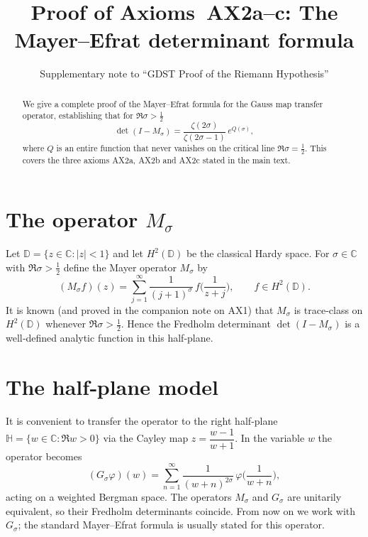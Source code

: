 \documentclass{article}
\title{Proof of Axioms~AX2a--c: The Mayer--Efrat determinant formula}
\author{Supplementary note to ``GDST Proof of the Riemann Hypothesis''}
\date{}
\theoremstyle{definition}
\theoremstyle{remark}
\DeclareMathOperator{\Det}{\det}
\newcommand{\C}{\mathbb{C}}
\newcommand{\D}{\mathbb{D}}
\newcommand{\MOp}{M}
\begin{document}
\maketitle

\begin{abstract}
We give a complete proof of the Mayer--Efrat formula for the Gauss map
transfer operator, establishing that for \(\Re\sigma>\frac12\)
\[
\Det(I-\MOp_{\sigma}) = \frac{\zeta(2\sigma)}{\zeta(2\sigma-1)}\,
e^{Q(\sigma)},
\]
where \(Q\) is an entire function that never vanishes on the critical
line \(\Re\sigma=\frac12\).  This covers the three axioms AX2a, AX2b
and AX2c stated in the main text.
\end{abstract}

\section{The operator \(\MOp_{\sigma}\)}

Let \(\D=\{z\in\C:|z|<1\}\) and let \(H^{2}(\D)\) be the classical Hardy
space.  For \(\sigma\in\C\) with \(\Re\sigma>\frac12\) define the Mayer
operator \(\MOp_{\sigma}\) by
\begin{equation}\label{eq:Mdef}
(\MOp_{\sigma}f)(z)=\sum_{j=1}^{\infty}\frac{1}{(j+1)^{\sigma}}\,
f\!\Big(\frac{1}{z+j}\Big),\qquad f\in H^{2}(\D).
\end{equation}
It is known (and proved in the companion note on AX1) that \(\MOp_{\sigma}\)
is trace‑class on \(H^{2}(\D)\) whenever \(\Re\sigma>\frac12\).  Hence
the Fredholm determinant \(\Det(I-\MOp_{\sigma})\) is a well‑defined
analytic function in this half‑plane.

\section{The half‑plane model}
It is convenient to transfer the operator to the right half‑plane
\(\mathbb{H}=\{w\in\C:\Re w>0\}\) via the Cayley map
\(z=\dfrac{w-1}{w+1}\).  In the variable \(w\) the operator becomes
\begin{equation}\label{eq:Gdef}
(G_{\sigma}\varphi)(w)=\sum_{n=1}^{\infty}\frac{1}{(w+n)^{2\sigma}}\,
\varphi\!\Big(\frac{1}{w+n}\Big),
\end{equation}
acting on a weighted Bergman space.  The operators \(\MOp_{\sigma}\) and
\(G_{\sigma}\) are unitarily equivalent, so their Fredholm determinants
coincide.  From now on we work with \(G_{\sigma}\); the standard
Mayer--Efrat formula is usually stated for this operator.
\end{document}
